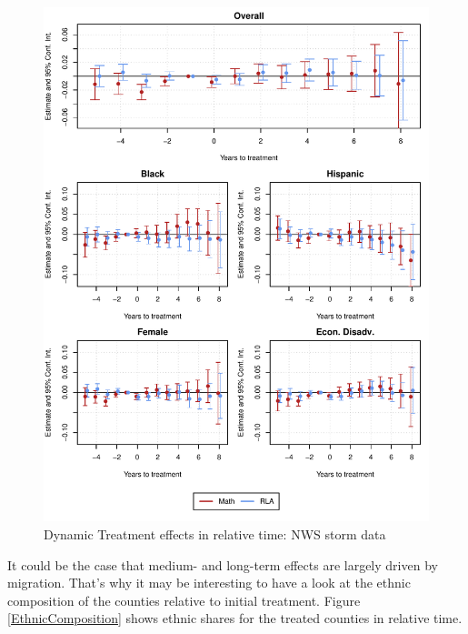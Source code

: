 \begin{figure}[!h]
	\centering
	\includegraphics[scale=1]{"../Code & Data/ResultsPlotStorm.pdf"}
	\caption{Dynamic Treatment effects in relative time: NWS storm data}
	\label{ResultsPlotStorm}
\end{figure}


It could be the case that medium- and long-term effects are largely driven by migration. That's why it may be interesting to have a look at the ethnic composition of the counties relative to initial treatment. Figure \ref{EthnicComposition} shows ethnic shares for the treated counties in relative time.

